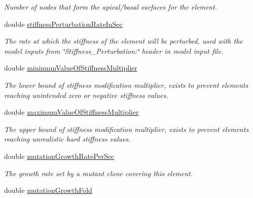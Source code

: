 \begin{DoxyCompactItemize}
\begin{DoxyCompactList}\small\item\em Number of nodes that form the apical/basal surfaces for the element. \end{DoxyCompactList}\item 
\hypertarget{classShapeBase_a525290b7f6921e964666d946b5d6774d}{}double \hyperlink{classShapeBase_a525290b7f6921e964666d946b5d6774d}{stiffness\+Perturbation\+Rate\+In\+Sec}\label{classShapeBase_a525290b7f6921e964666d946b5d6774d}

\begin{DoxyCompactList}\small\item\em The rate at which the stiffness of the element will be perturbed, used with the model inputs from \char`\"{}\+Stiffness\+\_\+\+Perturbation\+:\char`\"{} header in model input file. \end{DoxyCompactList}\item 
\hypertarget{classShapeBase_a9988f025f39118d8d29696709e6660d6}{}double \hyperlink{classShapeBase_a9988f025f39118d8d29696709e6660d6}{minimum\+Value\+Of\+Stiffness\+Multiplier}\label{classShapeBase_a9988f025f39118d8d29696709e6660d6}

\begin{DoxyCompactList}\small\item\em The lower bound of stiffness modification multiplier, exists to prevent elements reaching unintended zero or negative stiffness values. \end{DoxyCompactList}\item 
\hypertarget{classShapeBase_a915634dcedd74abf27fd746758bfe935}{}double \hyperlink{classShapeBase_a915634dcedd74abf27fd746758bfe935}{maximum\+Value\+Of\+Stiffness\+Multiplier}\label{classShapeBase_a915634dcedd74abf27fd746758bfe935}

\begin{DoxyCompactList}\small\item\em The upper bound of stiffness modification multiplier, exists to prevent elements reaching unrealistic hard stiffness values. \end{DoxyCompactList}\item 
\hypertarget{classShapeBase_a35ee77fed372f7702889bebb67875136}{}double \hyperlink{classShapeBase_a35ee77fed372f7702889bebb67875136}{mutation\+Growth\+Rate\+Per\+Sec}\label{classShapeBase_a35ee77fed372f7702889bebb67875136}

\begin{DoxyCompactList}\small\item\em The growth rate set by a mutant clone covering this element. \end{DoxyCompactList}\item 
\hypertarget{classShapeBase_ac7b83cb76a8f4ec11a4a6292c2899ba2}{}double \hyperlink{classShapeBase_ac7b83cb76a8f4ec11a4a6292c2899ba2}{mutation\+Growth\+Fold}\label{classShapeBase_ac7b83cb76a8f4ec11a4a6292c2899ba2}


\end{DoxyCompactItemize}
